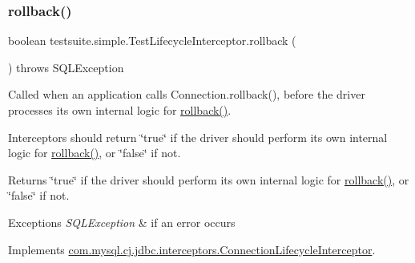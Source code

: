 \subsubsection{\texorpdfstring{rollback()}{rollback()}\hspace{0.1cm}{\footnotesize\ttfamily [1/2]}}
{\footnotesize\ttfamily boolean testsuite.\+simple.\+Test\+Lifecycle\+Interceptor.\+rollback (\begin{DoxyParamCaption}{ }\end{DoxyParamCaption}) throws S\+Q\+L\+Exception}

Called when an application calls Connection.\+rollback(), before the driver processes its own internal logic for \mbox{\hyperlink{classtestsuite_1_1simple_1_1_test_lifecycle_interceptor_a7cdeb42f7891e22dadce89627befbcdf}{rollback()}}.

Interceptors should return \char`\"{}true\char`\"{} if the driver should perform its own internal logic for \mbox{\hyperlink{classtestsuite_1_1simple_1_1_test_lifecycle_interceptor_a7cdeb42f7891e22dadce89627befbcdf}{rollback()}}, or \char`\"{}false\char`\"{} if not.

\begin{DoxyReturn}{Returns}
\char`\"{}true\char`\"{} if the driver should perform its own internal logic for \mbox{\hyperlink{classtestsuite_1_1simple_1_1_test_lifecycle_interceptor_a7cdeb42f7891e22dadce89627befbcdf}{rollback()}}, or \char`\"{}false\char`\"{} if not.
\end{DoxyReturn}

\begin{DoxyExceptions}{Exceptions}
{\em S\+Q\+L\+Exception} & if an error occurs \\
\hline
\end{DoxyExceptions}


Implements \mbox{\hyperlink{interfacecom_1_1mysql_1_1cj_1_1jdbc_1_1interceptors_1_1_connection_lifecycle_interceptor_a0659ae7aff8c74e8236b82deccee4fed}{com.\+mysql.\+cj.\+jdbc.\+interceptors.\+Connection\+Lifecycle\+Interceptor}}.

\mbox{\label{classtestsuite_1_1simple_1_1_test_lifecycle_interceptor_a75e431938104c0c3b8e1913b81ced992}} 
